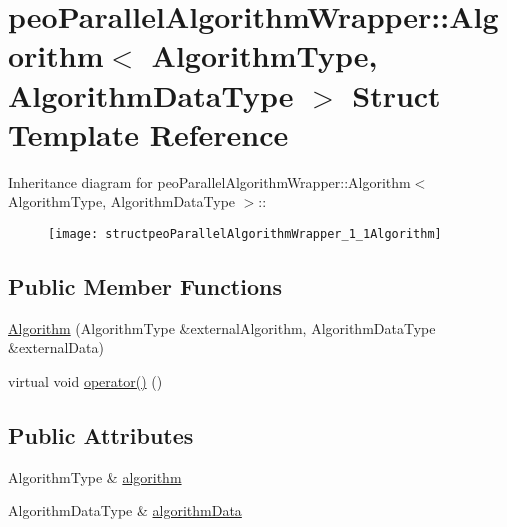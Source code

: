\hypertarget{structpeoParallelAlgorithmWrapper_1_1Algorithm}{
\section{peo\-Parallel\-Algorithm\-Wrapper::Algorithm$<$ Algorithm\-Type, Algorithm\-Data\-Type $>$ Struct Template Reference}
\label{structpeoParallelAlgorithmWrapper_1_1Algorithm}
}
Inheritance diagram for peo\-Parallel\-Algorithm\-Wrapper::Algorithm$<$ Algorithm\-Type, Algorithm\-Data\-Type $>$::\begin{figure}[H]
\begin{center}
\leavevmode
\texttt{[image: structpeoParallelAlgorithmWrapper\_1\_1Algorithm]}
\end{center}
\end{figure}
\subsection*{Public Member Functions}
\begin{CompactItemize}
\item 
\hypertarget{structpeoParallelAlgorithmWrapper_1_1Algorithm_bdd2048610a35f525d7cef9a9041caba}{
\hyperlink{structpeoParallelAlgorithmWrapper_1_1Algorithm_bdd2048610a35f525d7cef9a9041caba}{Algorithm} (Algorithm\-Type \&external\-Algorithm, Algorithm\-Data\-Type \&external\-Data)}
\label{structpeoParallelAlgorithmWrapper_1_1Algorithm_bdd2048610a35f525d7cef9a9041caba}

\item 
\hypertarget{structpeoParallelAlgorithmWrapper_1_1Algorithm_a54fa5366a7663491608399ab21ea092}{
virtual void \hyperlink{structpeoParallelAlgorithmWrapper_1_1Algorithm_a54fa5366a7663491608399ab21ea092}{operator()} ()}
\label{structpeoParallelAlgorithmWrapper_1_1Algorithm_a54fa5366a7663491608399ab21ea092}

\end{CompactItemize}
\subsection*{Public Attributes}
\begin{CompactItemize}
\item 
\hypertarget{structpeoParallelAlgorithmWrapper_1_1Algorithm_91681bf54649f58335c181515a92db7a}{
Algorithm\-Type \& \hyperlink{structpeoParallelAlgorithmWrapper_1_1Algorithm_91681bf54649f58335c181515a92db7a}{algorithm}}
\label{structpeoParallelAlgorithmWrapper_1_1Algorithm_91681bf54649f58335c181515a92db7a}

\item 
\hypertarget{structpeoParallelAlgorithmWrapper_1_1Algorithm_e812277c85c5b6884d2019849e7eabde}{
Algorithm\-Data\-Type \& \hyperlink{structpeoParallelAlgorithmWrapper_1_1Algorithm_e812277c85c5b6884d2019849e7eabde}{algorithm\-Data}}
\label{structpeoParallelAlgorithmWrapper_1_1Algorithm_e812277c85c5b6884d2019849e7eabde}

\end{CompactItemize}


